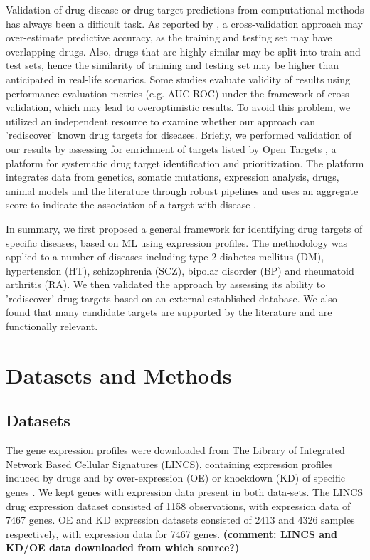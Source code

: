      Validation of drug-disease or drug-target predictions from computational methods has always been a difficult task. As reported by \cite{guney2017reproducible}, a cross-validation approach may over-estimate predictive accuracy, as the training and testing set may have overlapping drugs. Also, drugs that are highly similar may be split into train and test sets, hence the similarity of training and testing set may be higher than anticipated in real-life scenarios. Some studies evaluate validity of results using performance evaluation metrics (e.g. AUC-ROC) under the framework of cross-validation, which may lead to overoptimistic results. To avoid this problem, we utilized an independent resource to examine whether our approach can 'rediscover' known drug targets for diseases. Briefly, we performed validation of our results by assessing for enrichment of targets listed by Open Targets \cite{koscielny2017open}, a platform for systematic drug target identification and prioritization. The platform integrates data from genetics, somatic mutations, expression analysis, drugs, animal models and the literature through robust pipelines and uses an aggregate score to indicate the association of a target with disease \cite{koscielny2017open}.

    In summary, we first proposed a general framework for identifying drug targets of specific diseases, based on ML using expression profiles. The methodology was applied to a number of diseases including type 2 diabetes mellitus (DM), hypertension (HT), schizophrenia (SCZ), bipolar disorder (BP) and  rheumatoid arthritis (RA). We then validated the approach by assessing its ability to 'rediscover' drug targets based on an external established database. We also found that many candidate targets are supported by the literature and are functionally relevant. 

\section{Datasets and Methods}
  \subsection{Datasets}
    The gene expression profiles were downloaded from The Library of Integrated Network Based Cellular Signatures (LINCS), containing expression profiles induced by drugs and by over-expression (OE) or knockdown (KD) of specific genes \cite{subramanian2017next}. 
    We kept genes with expression data present in both data-sets. The LINCS drug expression dataset consisted of 1158 observations, with expression data of 7467 genes. OE and KD expression datasets consisted of 2413 and 4326 samples respectively, with expression data for 7467 genes.
    \textbf{(comment: LINCS and KD/OE data downloaded from which source?) }


